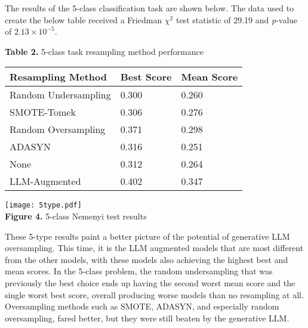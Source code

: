 \documentclass[runningheads]{llncs}
\newenvironment{nscenter}
 {\parskip=0pt\par\nopagebreak\centering}
 {\par\noindent\ignorespacesafterend}
\begin{document}
The results of the 5-class classification task are shown below. The data used to create the below table received a Friedman $\chi^2$ test statistic of 29.19 and \emph{p}-value of $2.13 \times 10^{-5}$.
\begin{nscenter}
{\bf Table 2.} 5-class task resampling method performance\\
\begin{tabular}{|l|l|l|}
\hline
Resampling Method & Best Score & Mean Score \\\hline
Random Undersampling & 0.300 & 0.260 \\\hline
SMOTE-Tomek & 0.306 & 0.276 \\\hline
Random Oversampling & 0.371 & 0.298 \\\hline
ADASYN & 0.316 & 0.251 \\\hline
None & 0.312 & 0.264 \\\hline
LLM-Augmented & 0.402 & 0.347 \\\hline
\end{tabular}

\texttt{[image: 5type.pdf]}\\
{\bf Figure 4.} 5-class Nemenyi test results
\end{nscenter}
These 5-type results paint a better picture of the potential of generative LLM oversampling. This time, it is the LLM augmented models that are most different from the other models, with these models also achieving the highest best and mean scores. In the 5-class problem, the random undersampling that was previously the best choice ends up having the second worst mean score and the single worst best score, overall producing worse models than no resampling at all. Oversampling methods such as SMOTE, ADASYN, and especially random oversampling, fared better, but they were still beaten by the generative LLM.
\end{document}
